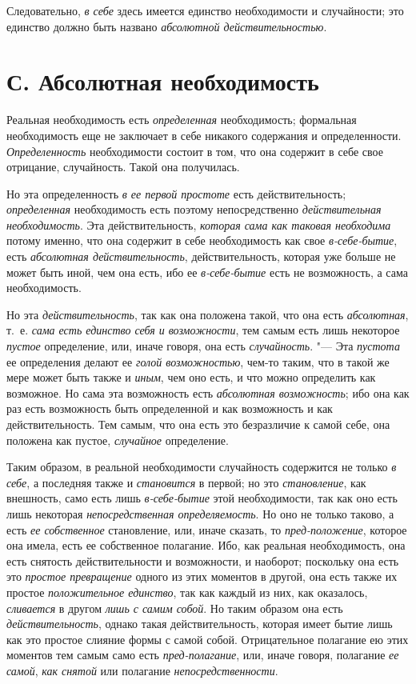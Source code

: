 Следовательно, {\em в себе} здесь имеется единство
необходимости и случайности; это единство должно быть названо
{\em абсолютной действительностью}.

\section[С. Абсолютная необходимость]{С. Абсолютная необходимость}

Реальная необходимость есть {\em определенная} необходимость; формальная
необходимость еще не заключает в себе никакого содержания и определенности.
{\em Определенность} необходимости состоит в том, что
она содержит в себе свое отрицание, случайность. Такой она получилась.

Но эта определенность {\em в ее первой простоте} есть
действительность; {\em определенная} необходимость есть
поэтому непосредственно {\em действительная
необходимость}. Эта действительность, {\em которая сама
как таковая необходима} потому именно, что она содержит в себе
необходимость как свое {\em в-себе-бытие}, есть
{\em абсолютная действительность}, действительность,
которая уже больше не может быть иной, чем она есть, ибо ее
{\em в-себе-бытие} есть не возможность, а сама необходимость.

Но эта {\em действительность}, так как она положена
такой, что она есть {\em абсолютная}, т.~е.
{\em сама есть единство себя и возможности}, тем самым
есть лишь некоторое {\em пустое} определение, или,
иначе говоря, она есть {\em случайность}. "--- Эта
{\em пустота} ее определения делают ее
{\em голой возможностью}, чем-то таким, что в такой же
мере может быть также и {\em иным}, чем оно есть, и что
можно определить как возможное. Но сама эта возможность есть
{\em абсолютная возможность}; ибо она как раз есть
возможность быть определенной и как возможность и как действительность. Тем
самым, что она есть это безразличие к самой себе, она положена как пустое,
{\em случайное} определение.

Таким образом, в реальной необходимости случайность содержится не только
{\em в себе}, а последняя также и
{\em становится} в первой; но это
{\em становление}, как внешность, само есть лишь
{\em в-себе-бытие} этой необходимости, так как оно есть
лишь некоторая {\em непосредственная определяемость}.
Но оно не только таково, а есть {\em ее собственное}
становление, или, иначе сказать, то
{\em пред-положение}, которое она имела, есть ее
собственное полагание. Ибо, как реальная необходимость, она есть снятость
действительности и возможности, и наоборот; поскольку она есть это
{\em простое превращение} одного из этих моментов в
другой, она есть также их простое {\em положительное
единство}, так как каждый из них, как оказалось,
{\em сливается} в другом {\em лишь
с самим собой}. Но таким образом она есть
{\em действительность}, однако такая действительность,
которая имеет бытие лишь как это простое слияние формы с самой собой.
Отрицательное полагание ею этих моментов тем самым само есть
{\em пред-полагание}, или, иначе говоря, полагание
{\em ее самой}, {\em как снятой}
или полагание {\em непосредственности}.

